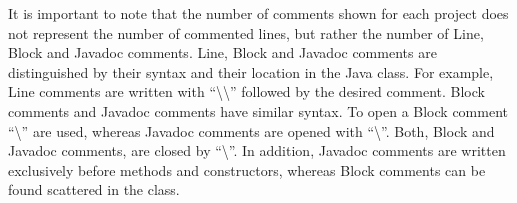 It is important to note that the number of comments shown for each project does not represent the number of commented lines, but rather the number of Line, Block and Javadoc comments. Line, Block and Javadoc comments are distinguished by their syntax and their location in the Java class. For example, Line comments are written with ``\textbackslash\textbackslash'' followed by the desired comment. Block comments and Javadoc comments have similar syntax. To open a Block comment ``\textbackslash\text{*}'' are used, whereas Javadoc comments are opened with ``\textbackslash\text{*}\text{*}''. Both, Block and Javadoc comments, are closed by ``\text{*}\textbackslash''. In addition, Javadoc comments are written exclusively before methods and constructors, whereas Block comments can be found scattered in the class.  


